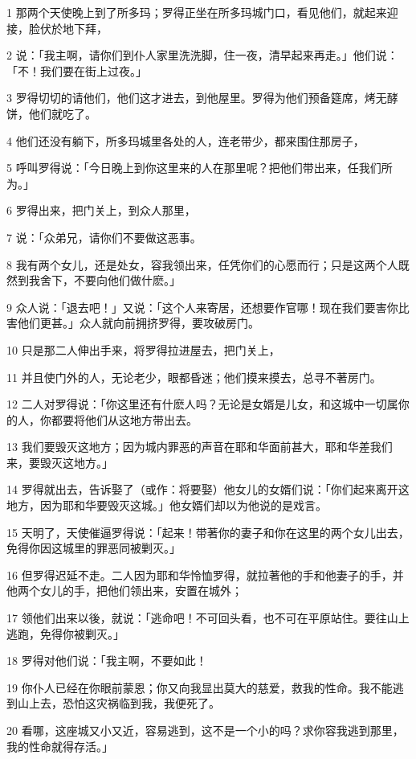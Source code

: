 \par 1 那两个天使晚上到了所多玛；罗得正坐在所多玛城门口，看见他们，就起来迎接，脸伏於地下拜，
\par 2 说：「我主啊，请你们到仆人家里洗洗脚，住一夜，清早起来再走。」他们说：「不！我们要在街上过夜。」
\par 3 罗得切切的请他们，他们这才进去，到他屋里。罗得为他们预备筵席，烤无酵饼，他们就吃了。
\par 4 他们还没有躺下，所多玛城里各处的人，连老带少，都来围住那房子，
\par 5 呼叫罗得说：「今日晚上到你这里来的人在那里呢？把他们带出来，任我们所为。」
\par 6 罗得出来，把门关上，到众人那里，
\par 7 说：「众弟兄，请你们不要做这恶事。
\par 8 我有两个女儿，还是处女，容我领出来，任凭你们的心愿而行；只是这两个人既然到我舍下，不要向他们做什麽。」
\par 9 众人说：「退去吧！」又说：「这个人来寄居，还想要作官哪！现在我们要害你比害他们更甚。」众人就向前拥挤罗得，要攻破房门。
\par 10 只是那二人伸出手来，将罗得拉进屋去，把门关上，
\par 11 并且使门外的人，无论老少，眼都昏迷；他们摸来摸去，总寻不著房门。
\par 12 二人对罗得说：「你这里还有什麽人吗？无论是女婿是儿女，和这城中一切属你的人，你都要将他们从这地方带出去。
\par 13 我们要毁灭这地方；因为城内罪恶的声音在耶和华面前甚大，耶和华差我们来，要毁灭这地方。」
\par 14 罗得就出去，告诉娶了（或作：将要娶）他女儿的女婿们说：「你们起来离开这地方，因为耶和华要毁灭这城。」他女婿们却以为他说的是戏言。
\par 15 天明了，天使催逼罗得说：「起来！带著你的妻子和你在这里的两个女儿出去，免得你因这城里的罪恶同被剿灭。」
\par 16 但罗得迟延不走。二人因为耶和华怜恤罗得，就拉著他的手和他妻子的手，并他两个女儿的手，把他们领出来，安置在城外；
\par 17 领他们出来以後，就说：「逃命吧！不可回头看，也不可在平原站住。要往山上逃跑，免得你被剿灭。」
\par 18 罗得对他们说：「我主啊，不要如此！
\par 19 你仆人已经在你眼前蒙恩；你又向我显出莫大的慈爱，救我的性命。我不能逃到山上去，恐怕这灾祸临到我，我便死了。
\par 20 看哪，这座城又小又近，容易逃到，这不是一个小的吗？求你容我逃到那里，我的性命就得存活。」
